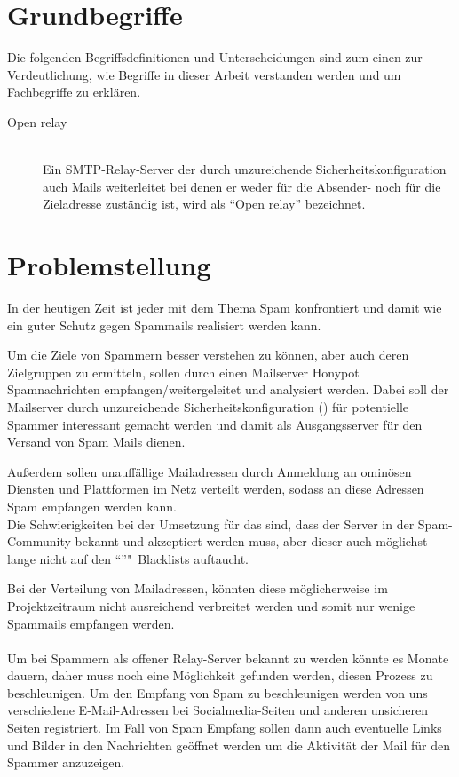 \documentclass[a4paper,11pt,singlespacing]{article}
\begin{document}
\section{Grundbegriffe}\label{sec:Grundbegriffe}
	Die folgenden Begriffsdefinitionen und Unterscheidungen sind zum einen zur Verdeutlichung, wie Begriffe in dieser Arbeit verstanden werden und um Fachbegriffe zu erklären.
	
	\begin{description}
	\item[Open relay\label{itm:OpenRelay}]\hfill \\
		Ein SMTP-Relay-Server der durch unzureichende Sicherheitskonfiguration auch Mails weiterleitet bei denen er weder für die Absender- noch für die Zieladresse zuständig ist, wird als "`Open relay"' bezeichnet.\cite{SMTP-Relay-Server}
	\end{description}


\section{Problemstellung}\label{sec:Problemstellung}
	In der heutigen Zeit ist jeder mit dem Thema Spam konfrontiert und damit wie ein guter Schutz gegen Spammails realisiert werden kann.	
	
	Um die Ziele von Spammern besser verstehen zu können, aber auch deren Zielgruppen zu ermitteln, sollen durch einen Mailserver Honypot Spamnachrichten empfangen/weitergeleitet und analysiert werden. 
	Dabei soll der Mailserver durch unzureichende Sicherheitskonfiguration () für potentielle Spammer interessant gemacht werden und damit als Ausgangsserver für den Versand von Spam Mails dienen.
	
	Außerdem sollen unauffällige Mailadressen durch Anmeldung an ominösen Diensten und Plattformen im Netz verteilt werden, sodass an diese Adressen Spam empfangen werden kann.
\\
	Die Schwierigkeiten bei der Umsetzung für das  sind, dass der Server in der Spam-Community bekannt und akzeptiert werden muss, aber dieser auch möglichst lange nicht auf den "`"'"~Blacklists auftaucht.
	
	Bei der Verteilung von Mailadressen, könnten diese möglicherweise im Projektzeitraum nicht ausreichend verbreitet werden und somit nur wenige Spammails empfangen werden.
\\\\
	Um bei Spammern als offener Relay-Server bekannt zu werden könnte es Monate dauern, daher muss noch eine Möglichkeit gefunden werden, diesen Prozess zu beschleunigen.
	Um den Empfang von Spam zu beschleunigen werden von uns verschiedene E-Mail-Adressen bei Socialmedia-Seiten und anderen unsicheren Seiten registriert.
	Im Fall von Spam Empfang sollen dann auch eventuelle Links und Bilder in den Nachrichten geöffnet werden um die Aktivität der Mail für den Spammer anzuzeigen.
\end{document}
